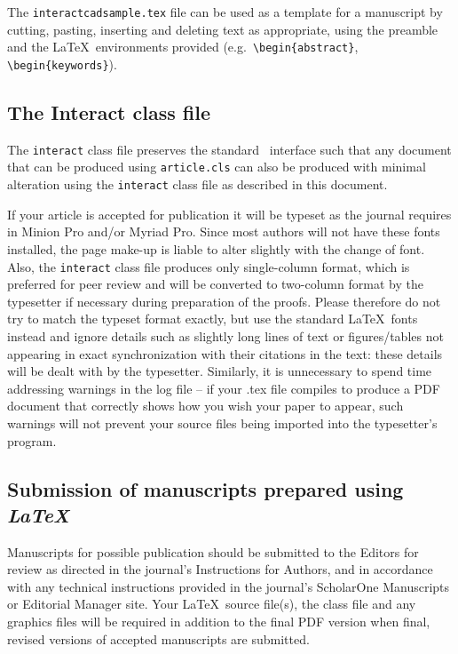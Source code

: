 \documentclass[]{interact}
\theoremstyle{plain}%
\theoremstyle{definition}
\theoremstyle{remark}
\begin{document}
The \texttt{interactcadsample.tex} file can be used as a template for a
manuscript by cutting, pasting, inserting and deleting text as
appropriate, using the preamble and the \LaTeX~environments provided
(e.g.~\texttt{\textbackslash{}begin\{abstract\}},
\texttt{\textbackslash{}begin\{keywords\}}).

\hypertarget{the-class-file}{%
\subsection{\texorpdfstring{The \textsf{Interact} class
file}{The  class file}}\label{the-class-file}}

The \texttt{interact} class file preserves the standard
\LaTeXe~interface such that any document that can be produced using
\texttt{article.cls} can also be produced with minimal alteration using
the \texttt{interact} class file as described in this document.

If your article is accepted for publication it will be typeset as the
journal requires in Minion Pro and/or Myriad Pro. Since most authors
will not have these fonts installed, the page make-up is liable to alter
slightly with the change of font. Also, the \texttt{interact} class file
produces only single-column format, which is preferred for peer review
and will be converted to two-column format by the typesetter if
necessary during preparation of the proofs. Please therefore do not try
to match the typeset format exactly, but use the standard \LaTeX~fonts
instead and ignore details such as slightly long lines of text or
figures/tables not appearing in exact synchronization with their
citations in the text: these details will be dealt with by the
typesetter. Similarly, it is unnecessary to spend time addressing
warnings in the log file -- if your .tex file compiles to produce a PDF
document that correctly shows how you wish your paper to appear, such
warnings will not prevent your source files being imported into the
typesetter's program.

\hypertarget{submission-of-manuscripts-prepared-using}{%
\subsection{\texorpdfstring{Submission of manuscripts prepared using
\emph{\LaTeX}}{Submission of manuscripts prepared using }}\label{submission-of-manuscripts-prepared-using}}

Manuscripts for possible publication should be submitted to the Editors
for review as directed in the journal's Instructions for Authors, and in
accordance with any technical instructions provided in the journal's
ScholarOne Manuscripts or Editorial Manager site. Your \LaTeX~source
file(s), the class file and any graphics files will be required in
addition to the final PDF version when final, revised versions of
accepted manuscripts are submitted.
\end{document}
